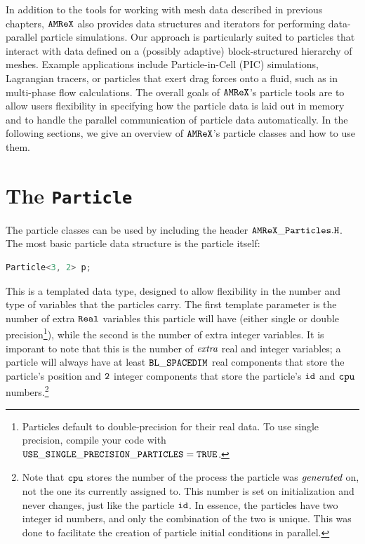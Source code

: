 In addition to the tools for working with mesh data described in previous chapters, $\tt{AMReX}$ also provides data structures and iterators for performing data-parallel particle simulations. Our approach is particularly suited to particles that interact with data defined on a (possibly adaptive) block-structured hierarchy of meshes. Example applications include Particle-in-Cell (PIC) simulations, Lagrangian tracers, or particles that exert drag forces onto a fluid, such as in multi-phase flow calculations. The overall goals of $\tt{AMReX}$'s particle tools are to allow users flexibility in specifying how the particle data is laid out in memory and to handle the parallel communication of particle data automatically. In the following sections, we give an overview of $\tt{AMReX}$'s particle classes and how to use them.

\section{The \tt{Particle}}
\label{sec:Particles:Particle}

The particle classes can be used by including the header $\tt{AMReX\_Particles.H}$. The most basic particle data structure is the particle itself: 

\begin{lstlisting}[language=cpp]
  Particle<3, 2> p;
\end{lstlisting}

This is a templated data type, designed to allow flexibility in the number and type of variables that the particles carry. The first template parameter is
the number of extra $\tt{Real}$ variables this particle will have (either single or double precision\footnote{Particles default to double-precision for their real data. To use single precision, compile your code with $\tt{USE\_SINGLE\_PRECISION\_PARTICLES=TRUE}$.}), while the second is the number of extra integer variables. 
It is imporant to note that this is the number of $\emph{extra}$ real and integer variables; a particle will always have at least $\tt{BL\_SPACEDIM}$ real components that store the particle's position and $\tt{2}$ integer components that store the particle's $\tt{id}$ and $\tt{cpu}$ numbers.\footnote{Note that $\tt{cpu}$ stores the number of the process the particle was $\emph{generated}$ on, not the one its currently assigned to. This number is set on initialization and never changes, just like the particle $\tt{id}$. In essence, the particles have two integer id numbers, and only the combination of the two is unique. This was done to facilitate the creation of particle initial conditions in parallel.}

